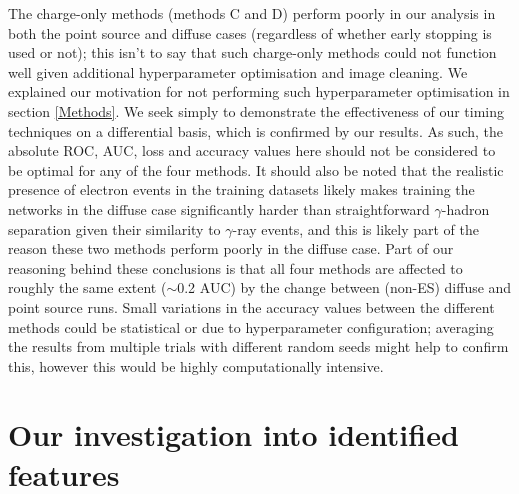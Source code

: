 The charge-only methods \cite{Shilon} (methods C and D) perform poorly in our analysis in both the point source and diffuse cases (regardless of whether early stopping is used or not); this isn't to say that such charge-only methods could not function well given additional hyperparameter optimisation and image cleaning. We explained our motivation for not performing such hyperparameter optimisation in section \ref{Methods}. We seek simply to demonstrate the effectiveness of our timing techniques on a differential basis, which is confirmed by our results. As such, the absolute ROC, AUC, loss and accuracy values here should not be considered to be optimal for any of the four methods. It should also be noted that the realistic presence of electron events in the training datasets likely makes training the networks in the diffuse case significantly harder than straightforward $\gamma$-hadron separation given their similarity to $\gamma$-ray events, and this is likely part of the reason these two methods perform poorly in the diffuse case. Part of our reasoning behind these conclusions is that all four methods are affected to roughly the same extent ($\sim$0.2 AUC) by the change between (non-ES) diffuse and point source runs. Small variations in the accuracy values between the different methods could be statistical or due to hyperparameter configuration; averaging the results from multiple trials with different random seeds might help to confirm this, however this would be highly computationally intensive.

\section{Our investigation into identified features}


